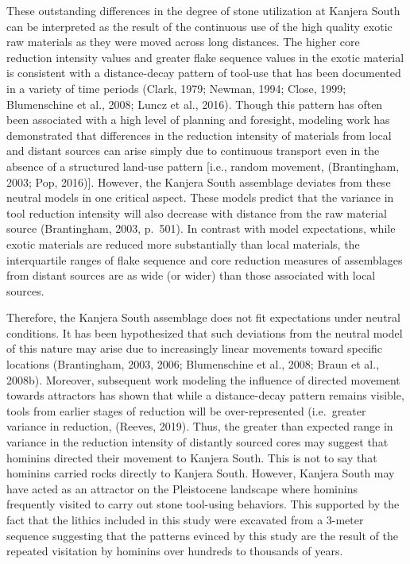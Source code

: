 \documentclass[]{elsarticle} %
\begin{document}
These outstanding differences in the degree of stone utilization at
Kanjera South can be interpreted as the result of the continuous use of
the high quality exotic raw materials as they were moved across long
distances. The higher core reduction intensity values and greater flake
sequence values in the exotic material is consistent with a
distance-decay pattern of tool-use that has been documented in a variety
of time periods (Clark, 1979; Newman, 1994; Close, 1999; Blumenschine et
al., 2008; Luncz et al., 2016). Though this pattern has often been
associated with a high level of planning and foresight, modeling work
has demonstrated that differences in the reduction intensity of
materials from local and distant sources can arise simply due to
continuous transport even in the absence of a structured land-use
pattern {[}i.e., random movement, (Brantingham, 2003; Pop, 2016){]}.
However, the Kanjera South assemblage deviates from these neutral models
in one critical aspect. These models predict that the variance in tool
reduction intensity will also decrease with distance from the raw
material source (Brantingham, 2003, p.~501). In contrast with model
expectations, while exotic materials are reduced more substantially than
local materials, the interquartile ranges of flake sequence and core
reduction measures of assemblages from distant sources are as wide (or
wider) than those associated with local sources.

Therefore, the Kanjera South assemblage does not fit expectations under
neutral conditions. It has been hypothesized that such deviations from
the neutral model of this nature may arise due to increasingly linear
movements toward specific locations (Brantingham, 2003, 2006;
Blumenschine et al., 2008; Braun et al., 2008b). Moreover, subsequent
work modeling the influence of directed movement towards attractors has
shown that while a distance-decay pattern remains visible, tools from
earlier stages of reduction will be over-represented (i.e.~greater
variance in reduction, (Reeves, 2019). Thus, the greater than expected
range in variance in the reduction intensity of distantly sourced cores
may suggest that hominins directed their movement to Kanjera South. This
is not to say that hominins carried rocks directly to Kanjera South.
However, Kanjera South may have acted as an attractor on the Pleistocene
landscape where hominins frequently visited to carry out stone
tool-using behaviors. This supported by the fact that the lithics
included in this study were excavated from a 3-meter sequence suggesting
that the patterns evinced by this study are the result of the repeated
visitation by hominins over hundreds to thousands of years.
\end{document}
